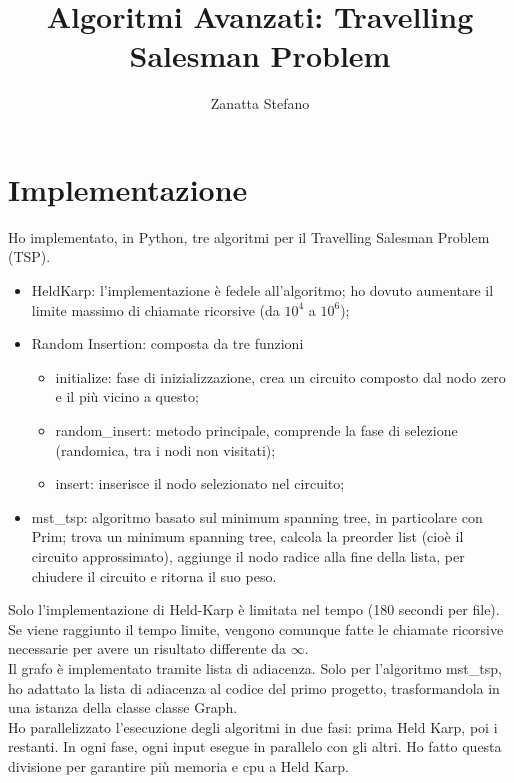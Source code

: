 \documentclass[11pt]{article}
\title{Algoritmi Avanzati: Travelling Salesman Problem}
\author{Zanatta Stefano}
\begin{document}
\maketitle
\section{Implementazione}\label{sec:implementazione}
    Ho implementato, in Python, tre algoritmi per il Travelling Salesman Problem (TSP).
    \begin{itemize}
        \item Held\-Karp: l'implementazione è fedele all'algoritmo; ho dovuto aumentare il limite massimo di chiamate ricorsive (da $10^4$ a $10^6$);
        \item Random Insertion: composta da tre funzioni
            \begin{itemize}
                \item initialize: fase di inizializzazione, crea un circuito composto dal nodo zero e il più vicino a questo;
                \item random\_insert: metodo principale, comprende la fase di selezione (randomica, tra i nodi non visitati);
                \item insert: inserisce il nodo selezionato nel circuito;
            \end{itemize}
        \item mst\_tsp: algoritmo basato sul minimum spanning tree, in particolare con Prim; trova un minimum spanning tree, calcola la preorder list (cioè il circuito approssimato), aggiunge il nodo radice alla fine della lista, per chiudere il circuito e ritorna il suo peso.
    \end{itemize}
    Solo l'implementazione di Held-Karp è limitata nel tempo (180 secondi per file).
    Se viene raggiunto il tempo limite, vengono comunque fatte le chiamate ricorsive necessarie per avere un risultato differente da {$\infty$}.\\
    Il grafo è implementato tramite lista di adiacenza.
    Solo per l'algoritmo mst\_tsp, ho adattato la lista di adiacenza al codice del primo progetto, trasformandola in una istanza della classe classe Graph.\\
    Ho parallelizzato l'esecuzione degli algoritmi in due fasi: prima Held Karp, poi i restanti.
    In ogni fase, ogni input esegue in parallelo con gli altri.
    Ho fatto questa divisione per garantire più memoria e cpu a Held Karp.
\end{document}
